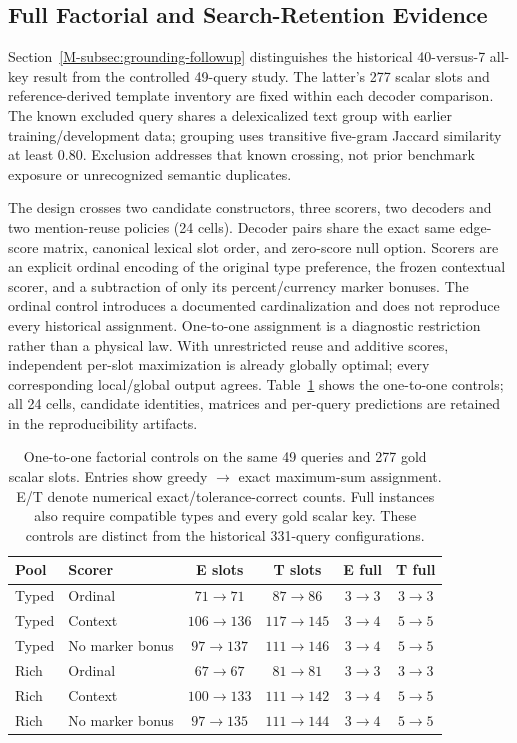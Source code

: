 \subsection{Full Factorial and Search-Retention Evidence}
\label{app:factorial-details}

Section~\ref{M-subsec:grounding-followup} distinguishes the historical 40-versus-7 all-key result from the controlled 49-query study. The latter's 277 scalar slots and reference-derived template inventory are fixed within each decoder comparison. The known excluded query shares a delexicalized text group with earlier training/development data; grouping uses transitive five-gram Jaccard similarity at least 0.80. Exclusion addresses that known crossing, not prior benchmark exposure or unrecognized semantic duplicates.

The design crosses two candidate constructors, three scorers, two decoders
and two mention-reuse policies (24 cells). Decoder pairs share the exact
same edge-score matrix, canonical lexical slot order, and zero-score null
option. Scorers are an explicit ordinal encoding of the original type
preference, the frozen contextual scorer, and a subtraction of only its
percent/currency marker bonuses. The ordinal control introduces a documented
cardinalization and does not reproduce every historical assignment.
One-to-one assignment is a diagnostic restriction rather than a physical
law. With unrestricted reuse and additive scores, independent per-slot
maximization is already globally optimal; every corresponding local/global
output agrees. Table~\ref{tab:grounding-factorial-diagnostic} shows the
one-to-one controls; all 24 cells, candidate identities, matrices and
per-query predictions are retained in the reproducibility artifacts.

\begin{table}[t]
\centering
\caption{One-to-one factorial controls on the same 49 queries and 277 gold
scalar slots. Entries show greedy $\rightarrow$ exact maximum-sum assignment.
E/T denote numerical exact/tolerance-correct counts. Full instances also
require compatible types and every gold scalar key. These controls are
distinct from the historical 331-query configurations.}
\label{tab:grounding-factorial-diagnostic}
\small
\setlength{\tabcolsep}{3pt}
\begin{tabular}{@{}llcccc@{}}
\toprule
Pool & Scorer & E slots & T slots & E full & T full\\
\midrule
Typed & Ordinal & $71\to71$ & $87\to86$ & $3\to3$ & $3\to3$\\
Typed & Context & $106\to136$ & $117\to145$ & $3\to4$ & $5\to5$\\
Typed & No marker bonus & $97\to137$ & $111\to146$ & $3\to4$ & $5\to5$\\
Rich & Ordinal & $67\to67$ & $81\to81$ & $3\to3$ & $3\to3$\\
Rich & Context & $100\to133$ & $111\to142$ & $3\to4$ & $5\to5$\\
Rich & No marker bonus & $97\to135$ & $111\to144$ & $3\to4$ & $5\to5$\\
\bottomrule
\end{tabular}
\end{table}

